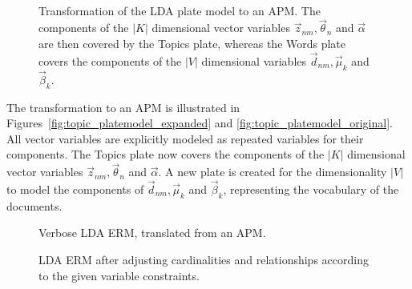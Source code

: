 \begin{figure}[t]
\begin{minipage}[t]{0.49\linewidth}
	\begin{center}
	\end{center}
\end{minipage}
\hspace{0.0cm}
\begin{minipage}[t]{0.49\linewidth}
	\begin{center}
	\end{center}
\end{minipage}\\
\caption[Transformation of LDA plate model to an APM]{Transformation of the LDA plate model to an APM. The components of the $|K|$ dimensional vector variables $\vec z_{nm}, \vec \theta_n$ and $\vec \alpha$ are then covered by the Topics plate, whereas the Words plate covers the components of the $|V|$ dimensional variables $\vec d_{nm}, \vec \mu_k$ and $\vec \beta_k$.}
\label{img:topic_platemodels}
\end{figure}

The transformation to an APM is illustrated in Figures~\ref{fig:topic_platemodel_expanded} and \ref{fig:topic_platemodel_original}. All vector variables are explicitly modeled as repeated variables for their components. The Topics plate now covers the components of the $|K|$ dimensional vector variables $\vec z_{nm}, \vec \theta_n$ and $\vec \alpha$. A new plate is created for the dimensionality $|V|$ to model the components of $\vec d_{nm}, \vec \mu_k$ and $\vec \beta_k$, representing the vocabulary of the documents.

\begin{figure}[p]
\centering
\scalebox{0.5}{\adjustTikzSize }
\caption[Verbose LDA ERM]{Verbose LDA ERM, translated from an APM.}\label{fig:topic_erm_good_verbose}
\end{figure}

\begin{figure}[p]
\centering
\scalebox{0.5}{\adjustTikzSize }
\caption[LDA ERM after taking constraints into account]{LDA ERM after adjusting cardinalities and relationships according to the given variable constraints.}\label{fig:topic_erm_good_constraints}
\end{figure}

